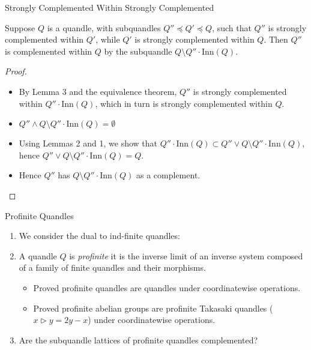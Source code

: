 \documentclass[10pt]{beamer}
\newcommand{\sq}{\preccurlyeq} %
\newcommand{\thru}{\rhd} %
\newcommand{\Inn}{\mathrm{Inn}} %
\theoremstyle{plain}
\begin{document}
\begin{frame}{Strongly Complemented Within Strongly Complemented}

\begin{theorem}
Suppose $Q$ is a quandle, with subquandles $Q''\sq Q'\sq Q$, such that $Q''$ is strongly complemented within $Q'$, while $Q'$ is strongly complemented within $Q$. Then $Q''$ is complemented within $Q$ by the subquandle $Q\setminus Q''\cdot \Inn(Q)$.
\end{theorem}
\pause

\begin{proof}
\begin{itemize}
    \item By Lemma 3 and the equivalence theorem, $Q''$ is strongly complemented within $Q''\cdot \Inn(Q)$, which in turn is strongly complemented within $Q$.
    \item $Q''\wedge Q\setminus Q''\cdot \Inn(Q) = \emptyset$
    \item Using Lemmas 2 and 1, we show that $Q''\cdot \Inn(Q) \subset Q''\vee Q\setminus Q''\cdot \Inn(Q)$, hence $Q''\vee Q\setminus Q''\cdot \Inn(Q) = Q$.
    \item Hence $Q''$ has $Q\setminus Q''\cdot \Inn(Q)$ as a complement.
\end{itemize}
\end{proof}
    
\end{frame}

\begin{frame}{Profinite Quandles}

\begin{enumerate}
    \item We consider the dual to ind-finite quandles:
    \vspace{0.1in}
    \pause
    \item A quandle $Q$ is \textit{profinite} it is the inverse limit of an inverse system composed of a family of finite quandles and their morphisms.
    \vspace{0.1in}
    \begin{itemize}
        \pause
        \item Proved profinite quandles are quandles under coordinatewise operations.
        \vspace{0.1in}
        \pause
        \item Proved profinite abelian groups are profinite Takasaki quandles ($x\thru y=2y-x$) under coordinatewise operations.
    \end{itemize}
    \vspace{0.2in}
    \pause
    \item Are the subquandle lattices of profinite quandles complemented?
\end{enumerate}
\end{frame}
\end{document}
